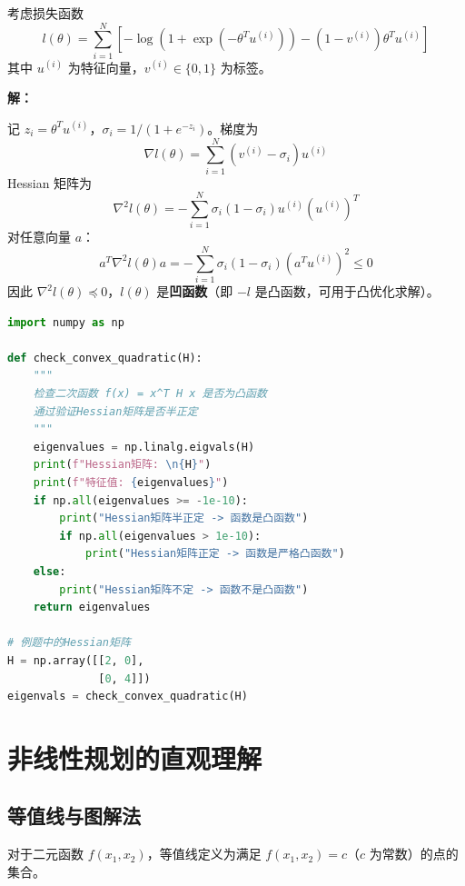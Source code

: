 \begin{example}\label{ex:logistic-hessian}
考虑损失函数
\[
l(\theta) = \sum_{i=1}^N \left[-\log(1 + \exp(-\theta^T u^{(i)})) - (1 - v^{(i)}) \theta^T u^{(i)}\right]
\]
其中 $u^{(i)}$ 为特征向量，$v^{(i)} \in \{0, 1\}$ 为标签。

\textbf{解：}

记 $z_i = \theta^T u^{(i)}$，$\sigma_i = 1/(1 + e^{-z_i})$。梯度为
\[
\nabla l(\theta) = \sum_{i=1}^N (v^{(i)} - \sigma_i) u^{(i)}
\]
Hessian 矩阵为
\[
\nabla^2 l(\theta) = -\sum_{i=1}^N \sigma_i(1 - \sigma_i) u^{(i)} (u^{(i)})^T
\]
对任意向量 $a$：
\[
a^T \nabla^2 l(\theta) a = -\sum_{i=1}^N \sigma_i(1 - \sigma_i) (a^T u^{(i)})^2 \leq 0
\]
因此 $\nabla^2 l(\theta) \preceq 0$，$l(\theta)$ 是\textbf{凹函数}（即 $-l$ 是凸函数，可用于凸优化求解）。
\end{example}

\begin{lstlisting}[language=Python, caption=验证凸性（Python）]
import numpy as np

def check_convex_quadratic(H):
    """
    检查二次函数 f(x) = x^T H x 是否为凸函数
    通过验证Hessian矩阵是否半正定
    """
    eigenvalues = np.linalg.eigvals(H)
    print(f"Hessian矩阵: \n{H}")
    print(f"特征值: {eigenvalues}")
    if np.all(eigenvalues >= -1e-10):
        print("Hessian矩阵半正定 -> 函数是凸函数")
        if np.all(eigenvalues > 1e-10):
            print("Hessian矩阵正定 -> 函数是严格凸函数")
    else:
        print("Hessian矩阵不定 -> 函数不是凸函数")
    return eigenvalues

# 例题中的Hessian矩阵
H = np.array([[2, 0],
              [0, 4]])
eigenvals = check_convex_quadratic(H)
\end{lstlisting}

\section{非线性规划的直观理解}\label{sec:intuitive}

\subsection{等值线与图解法}

对于二元函数 $f(x_1, x_2)$，等值线定义为满足 $f(x_1, x_2) = c$（$c$ 为常数）的点的集合。

